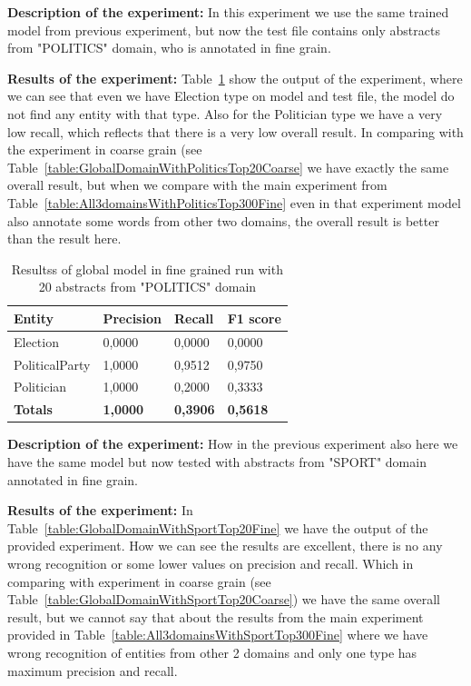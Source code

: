 \documentclass[thesis=M,english]{FITthesis}[2018/05/30]
\begin{document}
\textbf{Description of the experiment:} In this experiment we use the same trained model from previous experiment, but now the test file contains only abstracts from "POLITICS" domain, who is annotated in fine grain.

\textbf{Results of the experiment:} Table~\ref{table:GlobalDomainWithPoliticsTop20Fine} show the output of the experiment, where we can see that even we have Election type on model and test file, the model do not find any entity with that type. Also for the Politician type we have a very low recall, which reflects that there is a very low overall result. In comparing with the experiment in coarse grain (see Table~\ref{table:GlobalDomainWithPoliticsTop20Coarse} we have exactly the same overall result, but when we compare with the main experiment from Table~\ref{table:All3domainsWithPoliticsTop300Fine} even in that experiment model also annotate some words from other two domains, the overall result is better than the result here.

	\begin{table}[H]\centering
		\begin{tabular}{|l|l|l|l|}
			\hline {\textbf{Entity}} & {\textbf{Precision}} & {\textbf{Recall}} & {\textbf{F1 score}}\\\hline
				Election & 0,0000 & 0,0000 & 0,0000\\
				PoliticalParty & 1,0000 & 0,9512 & 0,9750\\
				Politician & 1,0000 & 0,2000 & 0,3333\\\hline
				\textbf{Totals} & \textbf{1,0000} & \textbf{0,3906} & \textbf{0,5618}\\\hline
		\end{tabular}
		\caption{Resultss of global model in fine grained run with 20 abstracts from "POLITICS" domain \label{table:GlobalDomainWithPoliticsTop20Fine}}
	\end{table}	

\textbf{Description of the experiment:} How in the previous experiment also here we have the same model but now tested with abstracts from "SPORT" domain annotated in fine grain.

\textbf{Results of the experiment:} In Table~\ref{table:GlobalDomainWithSportTop20Fine} we have the output of the provided experiment. How we can see the results are excellent, there is no any wrong recognition or some lower values on precision and recall. Which in comparing with experiment in coarse grain (see Table~\ref{table:GlobalDomainWithSportTop20Coarse}) we have the same overall result, but we cannot say that about the results from the main experiment provided in Table~\ref{table:All3domainsWithSportTop300Fine} where we have wrong recognition of entities from other 2 domains and only one type has maximum precision and recall.
\end{document}
